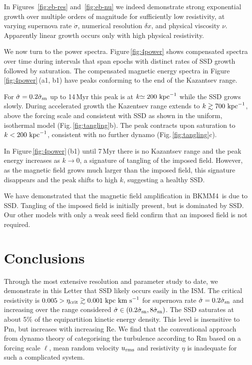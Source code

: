 \documentclass[preprint2]{aastex63}
\newcommand\SNr{\dot\sigma_{\rm sn}}
\newcommand\kpc{~ {\rm kpc}}
\newcommand\dx{ {\delta x}}
\newcommand\kms{~ {\rm km~ s}^{-1}}
\newcommand\BKM{{\sf BKMM4}}
\begin{document}
 {In {Figures~\ref{fig:eb-res} and~\ref{fig:eb-nu}} we indeed
 demonstrate strong exponential growth over multiple orders of magnitude
 {for sufficiently low resistivity, at varying supernova} rate $\dot\sigma$,
 numerical resolution $\dx$, and physical viscosity $\nu$. 
 {Apparently l}inear growth {occurs only} with high physical resistivity.}

 {We now turn to the power spectra. Figure\,\ref{fig:4power} shows
 compensated spectra over time during {intervals} that}
 {span epochs with distinct rates of SSD  growth followed by saturation.}
 The compensated magnetic energy spectra in Figure\,\ref{fig:4power}\,(a1, b1)
 have {peaks conforming to the end of the Kazantsev range.}

 {For ${\dot\sigma=0.2\SNr}$ up to 14\,Myr this peak is at
 $k{\simeq200}\kpc^{-1}$ while the
 SSD grows {slowly}.
 During accelerated growth the Kazentsev range extends to}
 $k\gtrsim{700}\kpc^{-1}$, above the forcing scale and consistent
 with SSD {as shown in the uniform, isothermal model}
 (Fig.\,\ref{fig:tangling}b).
 The peak contracts upon saturation to $k<{200}\kpc^{-1}$, consistent with no
 {further} dynamo (Fig.\,\ref{fig:tangling}c).

 In Figure\,\ref{fig:4power}\,(b1) {until 7\,Myr there is no Kazantsev range
 and the peak energy increases as $k\rightarrow0$, a signature of tangling of
 the imposed field.
 However, as the magnetic field grows much larger than the imposed field,
 this signature disappears and the peak shifts to high $k${, suggesting a healthy SSD}.}
 
 {We have demonstrated that the magnetic field amplification in \BKM\ is
 due to SSD. 
 Tangling of the imposed field is {initially} present, but is
 dominated by SSD. {O}ur other models {with only a weak seed field} 
  confirm {that} an imposed field is not required.
 }

\section{Conclusions}\label{sec:conc}

 {Through the most extensive resolution and parameter study to date, we
   demonstrate in this Letter that SSD
{likely occurs easily}
 in the ISM.
 The critical resistivity is $0.005>\eta_{\rm crit}\gtrsim0.001\kpc\kms$ for 
 supernova rate $\dot \sigma=0.2\SNr$ and increasing over the 
 range considered $\dot \sigma\in(0.2\SNr,8\SNr)$.
 The SSD
 saturates at about 5\% of the equipartition kinetic energy
 density.
 This level is insensitive to Pm, but increases with increasing Re.}
 We find that the conventional approach from dynamo theory of categorising the 
 turbulence according to Rm based on a forcing scale $\ell$, mean random
 velocity $u_{\rm rms}$ and resistivity $\eta$ is inadequate for such a
 complicated system.
\end{document}
